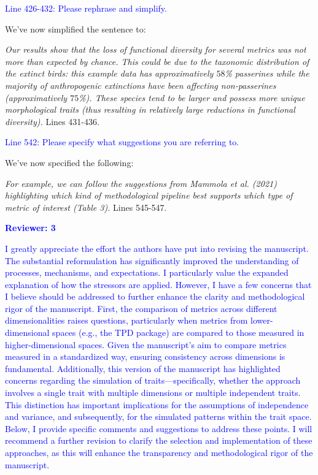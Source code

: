 \documentclass[
]{article}
\begin{document}
\textcolor{blue}{Line 426-432: Please rephrase and simplify.}

We've now simplified the sentence to:

\textit{Our results show that the loss of  functional diversity for several metrics was not more than expected by chance.
This could be due to the taxonomic distribution of the extinct birds: this example data has approximatively $58$\% passerines while the majority of anthropogenic extinctions have been affecting non-passerines (approximatively $75$\%).
These species tend to be larger and possess more unique morphological traits (thus resulting in relatively large reductions in functional diversity).} Lines 431-436. %

\textcolor{blue}{Line 542: Please specify what suggestions you are referring to.}

We've now specified the following:

\textit{For example, we can follow the suggestions from Mammola et al. (2021) highlighting which kind of methodological pipeline best supports which type of metric of interest (Table 3).} Lines 545-547. %

\textcolor{blue}{\textbf{Reviewer: 3}}

\textcolor{blue}{I greatly appreciate the effort the authors have put into revising the manuscript.
The substantial reformulation has significantly improved the understanding of processes, mechanisms, and expectations.
I particularly value the expanded explanation of how the stressors are applied.
However, I have a few concerns that I believe should be addressed to further enhance the clarity and methodological rigor of the manuscript.
First, the comparison of metrics across different dimensionalities raises questions, particularly when metrics from lower-dimensional spaces (e.g., the TPD package) are compared to those measured in higher-dimensional spaces.
Given the manuscript's aim to compare metrics measured in a standardized way, ensuring consistency across dimensions is fundamental.
Additionally, this version of the manuscript has highlighted concerns regarding the simulation of traits—specifically, whether the approach involves a single trait with multiple dimensions or multiple independent traits.
This distinction has important implications for the assumptions of independence and variance, and subsequently, for the simulated patterns within the trait space.
Below, I provide specific comments and suggestions to address these points.
I will recommend a further revision to clarify the selection and implementation of these approaches, as this will enhance the transparency and methodological rigor of the manuscript.}
\end{document}
